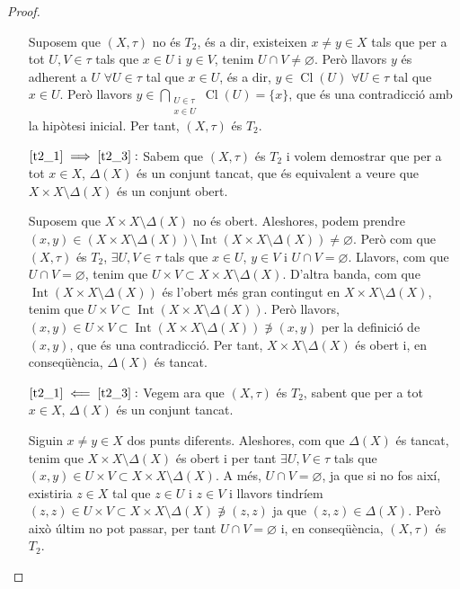 \documentclass[10pt,a4paper]{article}
\theoremstyle{definition}
\DeclareMathOperator{\Cl}{Cl} %
\DeclareMathOperator{\Int}{Int} %
\begin{document}
\begin{proof}
\begin{itemize}[leftmargin=2cm]
                  Suposem que $(X,\tau)$ no és $T_2$, és a dir, existeixen $x\ne y\in X$ tals que per a tot $U,V\in\tau$ tals que $x\in U$ i $y\in V$, tenim $U\cap V\ne\varnothing$. Però llavors $y$ és adherent a $U$ $\forall U\in\tau$ tal que $x\in U$, és a dir, $y\in\Cl(U)$ $\forall U\in\tau$ tal que $x\in U$. Però llavors $y\in\bigcap_{\substack{U\in \tau\\x\in U}}\Cl(U)=\{x\}$, que és una contradicció amb la hipòtesi inicial. Per tant, $(X,\tau)$ és $T_2$.
            \item [$\ref{t2_1}\implies\ref{t2_3}:$] Sabem que $(X,\tau)$ és $T_2$ i volem demostrar que per a tot $x\in X$, $\Delta (X)$ és un conjunt tancat, que és equivalent a veure que $X\times X\setminus\Delta (X)$ és un conjunt obert.

                  Suposem que $X\times X\setminus\Delta (X)$ no és obert. Aleshores, podem prendre $(x,y)\in (X\times X\setminus\Delta (X))\setminus\Int(X\times X\setminus\Delta (X))\ne\varnothing$. Però com que $(X,\tau)$ és $T_2$, $\exists U,V\in\tau$ tals que $x\in U$, $y\in V$ i $U\cap V=\varnothing$. Llavors, com que $U\cap V=\varnothing$, tenim que $U\times V\subset X\times X\setminus\Delta (X)$. D'altra banda, com que $\Int(X\times X\setminus\Delta (X))$ és l'obert més gran contingut en $X\times X\setminus\Delta (X)$, tenim que $U\times V\subset\Int(X\times X\setminus\Delta (X))$. Però llavors, $(x,y)\in U\times V\subset\Int(X\times X\setminus\Delta (X))\not\ni (x,y)$ per la definició de $(x,y)$, que és una contradicció. Per tant, $X\times X\setminus\Delta (X)$ és obert i, en conseqüència, $\Delta (X)$ és tancat.
            \item [$\ref{t2_1}\impliedby\ref{t2_3}:$] Vegem ara que $(X,\tau)$ és $T_2$, sabent que per a tot $x\in X$, $\Delta (X)$ és un conjunt tancat.

                  Siguin $x\ne y\in X$ dos punts diferents. Aleshores, com que $\Delta (X)$ és tancat, tenim que $X\times X\setminus\Delta (X)$ és obert i per tant $\exists U,V\in\tau$ tals que $(x,y)\in U\times V\subset X\times X\setminus\Delta (X)$. A més, $U\cap V=\varnothing$, ja que si no fos així, existiria $z\in X$ tal que $z\in U$ i $z\in V$ i llavors tindríem $(z,z)\in U\times V\subset X\times X\setminus\Delta (X)\not\ni (z,z)$ ja que $(z,z)\in \Delta (X)$. Però això últim no pot passar, per tant $U\cap V=\varnothing$ i, en conseqüència, $(X,\tau)$ és $T_2$.
      \end{itemize}
\end{proof}
\end{document}

